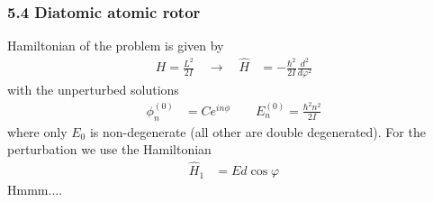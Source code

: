 \documentclass[10pt,a4paper]{article}
\theoremstyle{definition}
\begin{document}
\subsubsection{5.4 Diatomic atomic rotor}
Hamiltonian of the problem is given by
\begin{align}
H=\frac{L^2}{2I}\quad\rightarrow\quad\hat{H}&=-\frac{\hbar^2}{2I}\frac{d^2}{d\varphi^2}
\end{align}
with the unperturbed solutions
\begin{align}
\phi_n^{(0)}&=C e^{in\phi}\qquad E_n^{(0)}=\frac{\hbar^2n^2}{2I}
\end{align}
where only $E_0$  is non-degenerate (all other are double degenerated). 
For the perturbation we use the Hamiltonian
\begin{align}
\hat{H}_1&=Ed\cos\varphi
\end{align}
Hmmm....
\end{document}
